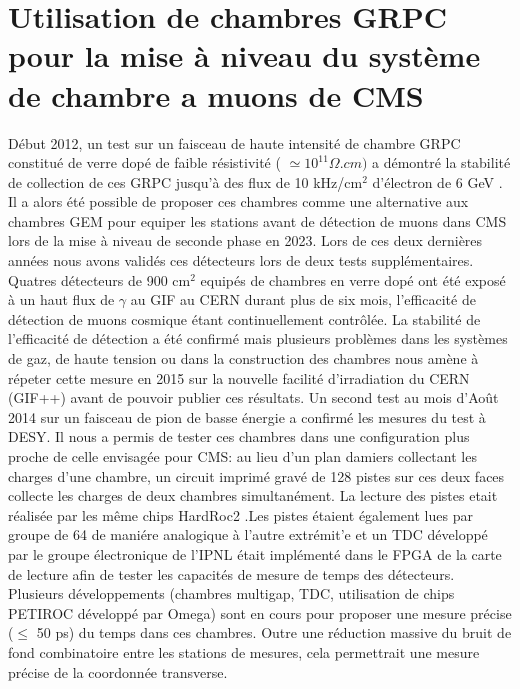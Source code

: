 \documentclass[9pt,french]{article}
\begin{document}
\section*{Utilisation de chambres GRPC pour la mise \`a niveau du syst\`eme de chambre a muons de CMS}

D\'ebut 2012, un test sur un faisceau de haute intensit\'e de chambre GRPC constitu\'e de verre dop\'e de faible r\'esistivit\'e ( $ \simeq 10^{11} \Omega.cm) $ a d\'emontr\'e la stabilit\'e de collection de ces GRPC jusqu'\`a des flux de 10 kHz/cm$^2$ d'\'electron de 6 GeV \cite{desy}. Il a alors \'et\'e possible de proposer ces chambres comme une alternative aux chambres GEM pour equiper les stations avant de d\'etection de muons dans CMS lors de la mise \`a niveau de seconde phase en 2023. Lors de ces deux derni\`eres ann\'ees nous avons valid\'es ces d\'etecteurs lors de deux tests suppl\'ementaires. Quatres d\'etecteurs de 900 cm$^2$ equip\'es de chambres en verre dop\'e ont \'et\'e expos\'e \`a un haut flux de $\gamma$ au GIF au CERN durant plus de six mois, l'efficacit\'e de d\'etection de muons cosmique \'etant continuellement contr\^ol\'ee. La stabilit\'e de l'efficacit\'e de d\'etection a \'et\'e confirm\'e mais plusieurs probl\`emes dans les syst\`emes de gaz, de haute tension ou dans la construction des chambres nous am\`ene \`a r\'epeter cette mesure en 2015 sur la nouvelle facilit\'e d'irradiation du CERN (GIF++) avant de pouvoir publier ces r\'esultats. Un second test au mois d'Ao\^ut 2014 sur un faisceau de pion de basse \'energie a confirm\'e les mesures du test \`a DESY. Il nous a permis de tester ces chambres dans une configuration plus proche de celle envisag\'ee pour CMS: au lieu d'un plan damiers collectant les charges d'une chambre, un circuit imprim\'e grav\'e de 128 pistes sur ces deux faces collecte les charges de deux chambres simultan\'ement. La lecture des pistes etait r\'ealis\'ee par les m\^eme chips HardRoc2 .Les pistes \'etaient \'egalement lues par groupe de 64 de mani\'ere analogique \`a l'autre extr\'emit'e et un TDC d\'evelopp\'e par le groupe \'electronique de l'IPNL \'etait impl\'ement\'e dans le FPGA de la carte de lecture afin de tester les capacit\'es  de mesure de temps des d\'etecteurs. Plusieurs d\'eveloppements (chambres multigap, TDC, utilisation de chips PETIROC d\'evelopp\'e par Omega) sont en cours pour proposer une mesure pr\'ecise ($\le$ 50 ps) du temps dans ces chambres. Outre une r\'eduction massive du bruit de fond combinatoire entre les stations de mesures, cela permettrait une mesure pr\'ecise de la coordonn\'ee transverse.            
\end{document}
